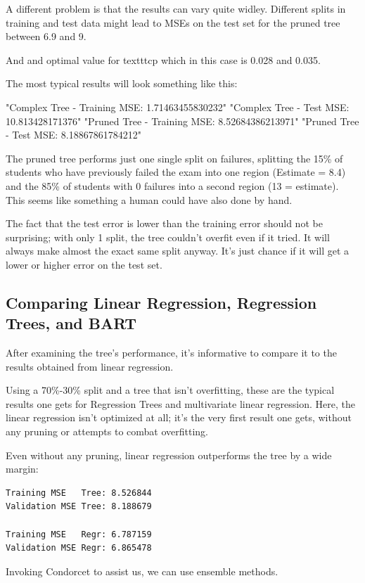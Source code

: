 \documentclass[12pt]{article}
\begin{document}
A different problem is that the results can vary quite widley. Different splits in training and test data might lead to MSEs on the test set for the pruned tree between 6.9 and 9.

And and optimal value for texttt{cp} which in this case is 0.028 and 0.035.


The most typical results will look something like this:

"Complex Tree - Training MSE: 1.71463455830232"
"Complex Tree -     Test MSE: 10.813428171376"
"Pruned Tree  - Training MSE: 8.52684386213971"
"Pruned Tree  -     Test MSE: 8.18867861784212"

The pruned tree performs just one single split on failures, splitting the 15\% of students who have previously failed the exam into one region (Estimate = 8.4) and the 85\% of students with 0 failures into a second region (13 = estimate). This seems like something a human could have also done by hand.

The fact that the test error is lower than the training error should not be surprising; with only 1 split, the tree couldn't overfit even if it tried. It will always make almost the exact same split anyway. It's just chance if it will get a lower or higher error on the test set.


\subsection{Comparing Linear Regression, Regression Trees, and BART}

After examining the tree's performance, it's informative to compare it to the results obtained from linear regression.

Using a 70\%-30\% split and a tree that isn't overfitting, these are the typical results one gets for Regression Trees and multivariate linear regression. Here, the linear regression isn't optimized at all; it's the very first result one gets, without any pruning or attempts to combat overfitting.

Even without any pruning, linear regression outperforms the tree by a wide margin:

\begin{verbatim}
Training MSE   Tree: 8.526844
Validation MSE Tree: 8.188679

Training MSE   Regr: 6.787159
Validation MSE Regr: 6.865478
\end{verbatim}

Invoking Condorcet to assist us, we can use ensemble methods.
\end{document}
